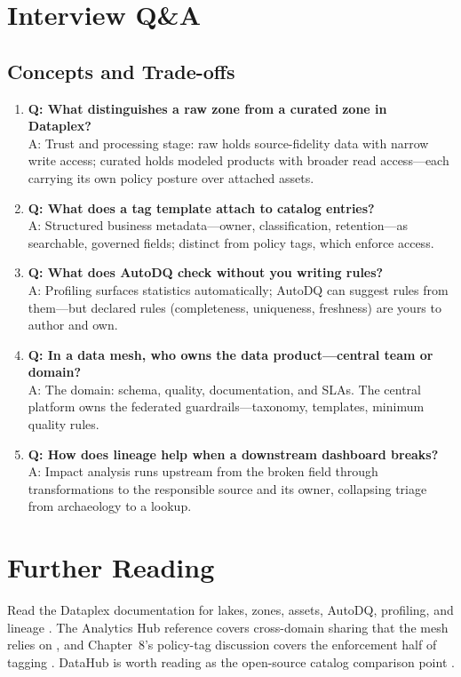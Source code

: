 \section{Interview Q\&A}
\subsection{Concepts and Trade-offs}
\begin{enumerate}
    \item \textbf{Q: What distinguishes a raw zone from a curated zone in Dataplex?}\\
    A: Trust and processing stage: raw holds source-fidelity data with narrow write access; curated holds modeled products with broader read access---each carrying its own policy posture over attached assets.

    \item \textbf{Q: What does a tag template attach to catalog entries?}\\
    A: Structured business metadata---owner, classification, retention---as searchable, governed fields; distinct from policy tags, which enforce access.

    \item \textbf{Q: What does AutoDQ check without you writing rules?}\\
    A: Profiling surfaces statistics automatically; AutoDQ can suggest rules from them---but declared rules (completeness, uniqueness, freshness) are yours to author and own.

    \item \textbf{Q: In a data mesh, who owns the data product---central team or domain?}\\
    A: The domain: schema, quality, documentation, and SLAs. The central platform owns the federated guardrails---taxonomy, templates, minimum quality rules.

    \item \textbf{Q: How does lineage help when a downstream dashboard breaks?}\\
    A: Impact analysis runs upstream from the broken field through transformations to the responsible source and its owner, collapsing triage from archaeology to a lookup.
\end{enumerate}

\section{Further Reading}
Read the Dataplex documentation for lakes, zones, assets, AutoDQ, profiling, and lineage \cite{googleclouddataplexdocs}. The Analytics Hub reference covers cross-domain sharing that the mesh relies on \cite{googlecloudanalyticshub}, and Chapter~8's policy-tag discussion covers the enforcement half of tagging \cite{googlecloudbigquerydocs}. DataHub is worth reading as the open-source catalog comparison point \cite{googlecloudarchitectureframework}.

